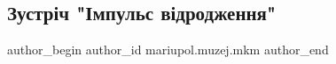  
 
 
 
 

\subsection{Зустріч "Імпульс відродження"}
\label{sec:27_08_2023.fb.mariupol.muzej.mkm.1.zustrich_impuls_vidrodzhennja}

\ifcmt
 author_begin
   author_id mariupol.muzej.mkm
 author_end
\fi
